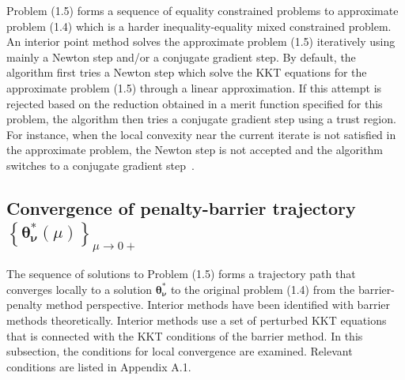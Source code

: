 \documentclass{article}
\newcommand{\bs}{ \boldsymbol}
\newcommand{\lt}{\left}
\newcommand{\rt}{\right}
\begin{document}
Problem (1.5) forms a sequence of equality constrained problems to approximate problem (1.4) which is a harder inequality-equality mixed constrained problem. An interior point method solves the approximate problem (1.5) iteratively using mainly a Newton step and/or a conjugate gradient step. By default, the algorithm first tries a Newton step which solve the KKT equations for the approximate problem (1.5) through a linear approximation. If this attempt is rejected based on the reduction obtained in a merit function specified for this problem, the algorithm then tries a conjugate gradient step using a trust region. For instance, when the local convexity near the current iterate is not satisfied in the approximate problem, the Newton step is not accepted and the algorithm switches to a conjugate gradient step~\cite{Byrd1999, Forsgren2002,Waltz2006}. 
\subsection{Convergence of penalty-barrier trajectory $\lt\{ \bs{\theta}_{\bs{\nu}}^*(\mu)\rt\}_{\mu \to 0+}$}
 The sequence of solutions to Problem (1.5) forms a trajectory path that converges locally to a solution $\bs{\theta}_{\bs{\nu}}^*$ to the original problem (1.4) from the barrier-penalty method perspective. Interior methods have been identified with barrier methods theoretically. Interior methods use a set of perturbed KKT equations that is connected with the KKT conditions of the barrier method. In this subsection, the conditions for local convergence are examined. Relevant conditions are listed in Appendix A.1. \\
\end{document}
